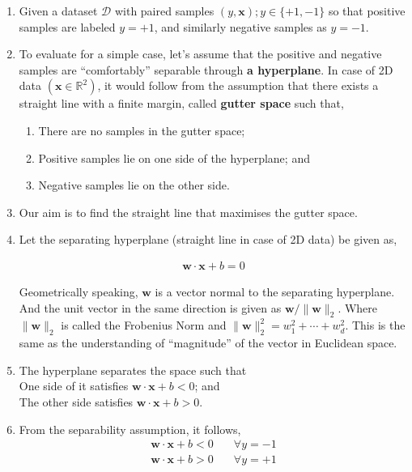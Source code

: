 \documentclass[11pt]{article}
\begin{document}
\begin{enumerate}
\item Given a dataset \(\mathcal{D}\) with paired samples
\((y,\mathbf{x}); y\in\{+1,-1\}\) so that positive
samples are labeled \(y=+1\), and similarly negative
samples as \(y=-1\).
\item To evaluate for a simple case, let’s assume that the
positive and negative samples are “comfortably”
separable through \textbf{a hyperplane}.  In case of 2D
data \((\mathbf{x}\in\mathbb{R}^2)\), it would follow
from the assumption that there exists a straight
line with a finite margin, called \textbf{gutter space}
such that,
\begin{enumerate}
\item There are no samples in the gutter space;
\item Positive samples lie on one side of the
hyperplane; and
\item Negative samples lie on the other side.
\end{enumerate}
\item Our aim is to find the straight line that maximises
the gutter space.
\item Let the separating hyperplane (straight line in case
of 2D data) be given as,

\begin{align}
  \mathbf{w}\cdot\mathbf{x} + b = 0
\end{align}

Geometrically speaking, \(\mathbf{w}\) is a vector
normal to the separating hyperplane.  And the unit
vector in the same direction is given as
\(\mathbf{w}/\|\mathbf{w}\|_2\).  Where
\(\|\mathbf{w}\|_2\) is called the Frobenius Norm and
\(\|\mathbf{w}\|_2^2 = w_1^2+\cdots+w_d^2\).  This is
the same as the understanding of “magnitude” of the
vector in Euclidean space.

\item The hyperplane separates the space such that \\[0pt]
One side of it satisfies
\(\mathbf{w}\cdot\mathbf{x}+b < 0\); and \\[0pt]
The other side satisfies
\(\mathbf{w}\cdot\mathbf{x}+b > 0\).

\item From the separability assumption, it follows, \\[0pt]
\begin{align*}
  \mathbf{w}\cdot\mathbf{x}+b < 0 &\quad\forall y=-1 \\
  \mathbf{w}\cdot\mathbf{x}+b > 0 &\quad\forall y=+1
\end{align*}


\end{enumerate}
\end{document}
